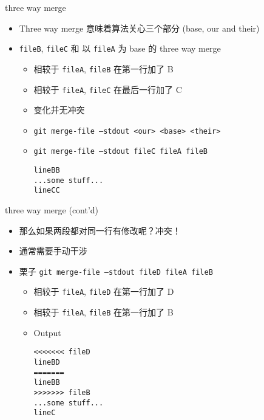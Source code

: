 \documentclass[aspectratio=169]{beamer}
\newcommand{\T}[1]{\texttt{#1}}
\begin{document}
\begin{frame}[fragile]{three way merge}
  \begin{itemize}
    \item Three way merge 意味着算法关心三个部分 (base, our and their)
	\item \T{fileB}, \T{fileC} 和 以 \T{fileA} 为 base 的 three way merge\begin{itemize}
      \item 相较于 \T{fileA}, \T{fileB} 在第一行加了 B
      \item 相较于 \T{fileA}, \T{fileC} 在最后一行加了 C
      \item 变化并无冲突
      \item \T{git merge-file --stdout <our> <base> <their>}
      \item \T{git merge-file --stdout fileC fileA fileB}\begin{verbatim}
lineBB
...some stuff...
lineCC
\end{verbatim}
    \end{itemize}
  \end{itemize}
\end{frame}

\begin{frame}[fragile]{three way merge (cont'd)}
  \begin{itemize}
    \item 那么如果两段都对同一行有修改呢？冲突！
    \item 通常需要手动干涉
    \item 栗子 \T{git merge-file --stdout fileD fileA fileB}\begin{itemize}
      \item 相较于 \T{fileA}, \T{fileD} 在第一行加了 D 
      \item 相较于 \T{fileA}, \T{fileB} 在第一行加了 B 
      \item Output\begin{verbatim}
<<<<<<< fileD
lineBD
=======
lineBB
>>>>>>> fileB
...some stuff...
lineC
\end{verbatim}
    \end{itemize}
  \end{itemize}
\end{frame}
\end{document}
